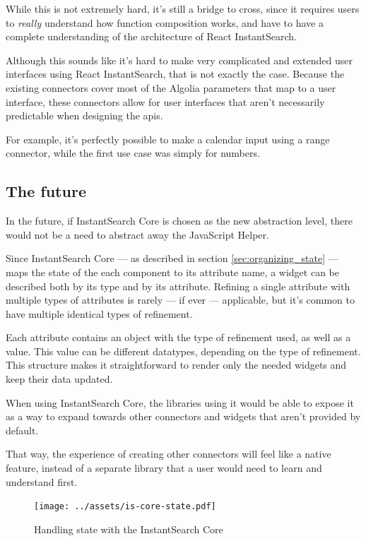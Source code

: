 While this is not extremely hard, it's still a bridge to cross, since it requires users to \emph{really} understand how function composition works, and have to have a complete understanding of the architecture of React InstantSearch.

Although this sounds like it's hard to make very complicated and extended user interfaces using React InstantSearch, that is not exactly the case. Because the existing connectors cover most of the Algolia parameters that map to a user interface, these connectors allow for user interfaces that aren't necessarily predictable when designing the \acrshort{api}s. 

For example, it's perfectly possible to make a calendar input using a range connector, while the first use case was simply for numbers.


\subsection{The future} %
\label{sub:the_future}

In the future, if InstantSearch Core is chosen as the new abstraction level, there would not be a need to abstract away the JavaScript Helper. 

Since InstantSearch Core --- as described in section \ref{sec:organizing_state} --- maps the state of the each component to its \gls{attribute} name, a widget can be described both by its type and by its attribute. Refining a single attribute with multiple types of attributes is rarely --- if ever --- applicable, but it's common to have multiple identical types of refinement.

Each attribute contains an object with the type of refinement used, as well as a value. This value can be different datatypes, depending on the type of refinement. This structure makes it straightforward to render only the needed widgets and keep their data updated.

When using InstantSearch Core, the libraries using it would be able to expose it as a way to expand towards other connectors and widgets that aren't provided by default.

That way, the experience of creating other connectors will feel like a native feature, instead of a separate \gls{library} that a user would need to learn and understand first.

\begin{figure}[H]
  \centering
  \texttt{[image: ../assets/is-core-state.pdf]}
  \caption{Handling state with the InstantSearch Core}
  \label{figure:is-core-state}
\end{figure}


